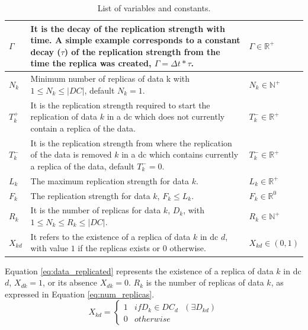 \documentclass[english]{article}
\begin{document}
\begin{table}[ht!]
\begin{tabular}{ |l|p{7.8cm}|l|}
		\hline
		$\Gamma$      & It is the decay of the replication strength with time. A simple example corresponds to a constant decay ($\tau$) of the replication strength from the time the replica was created, $\Gamma = \Delta t * \tau$. & $\Gamma \in \mathbb{R}^{+}$ \\
		\hline
		$N_{k}$           & Minimum number of replicas of data k with $1 \le N_{k} \le |DC|$, default $N_{k} = 1$. & $N_{k} \in \mathbb{N}^{+}$ \\
		\hline
		$T^{+}_{k}$       & It is the replication strength required to start the replication of data $k$ in a \gls{dc} which does not currently contain a replica of the data. & $T^{-}_{k} \in \mathbb{R}^{+}$ \\
		\hline
		$T^{-}_{k}$       & It is the replication strength from where the replication of the data is removed $k$ in a \gls{dc} which contains currently a replica of the data, default $T^{-}_{k} = 0$. & $T^{-}_{k} \in \mathbb{R}^{+}$ \\
		\hline
		$L_{k}$            & The maximum replication strength for data $k$. & $L_{k} \in \mathbb{R}^{+}$ \\
		\hline
		$F_{k}$            & The replication strength for data $k$, $F_{k} \le L_{k}$. & $F_{k} \in \mathbb{R}^{0}$ \\
		\hline
		$R_{k}$            & It is the number of replicas for data $k$, $D_{k}$, with $1 \le N_{k} \le R_{k} \le |DC|$. & $R_{k} \in \mathbb{N}^{+}$ \\
		\hline
		$X_{kd}$            & It refers to the existence of a replica of data $k$ in \gls{dc} $d$, with value $1$ if the replicas exists or $0$ otherwise. & $X_{kd} \in (0, 1)$\\
		\hline
	\end{tabular}
	
	\caption{List of variables and constants.}
	\label{tbl:vars_consts}
\end{table}

Equation \ref{eq:data_replicated} represents the existence of a replica of data $k$ in \gls{dc} $d$, $X_{dk} = 1$, or its absence $X_{dk} = 0$. $R_{k}$ is the number of replicas of data $k$, as expressed in Equation \ref{eq:num_replicas}.
\begin{equation} \label{eq:data_replicated}
	X_{kd} = \left\{
		\begin{array}{ll}
			1 & if D_{k} \in DC_{d} \text{ } (\exists D_{kd})\\
			0 & otherwise
		\end{array}
	\right.
\end{equation}
\end{document}
